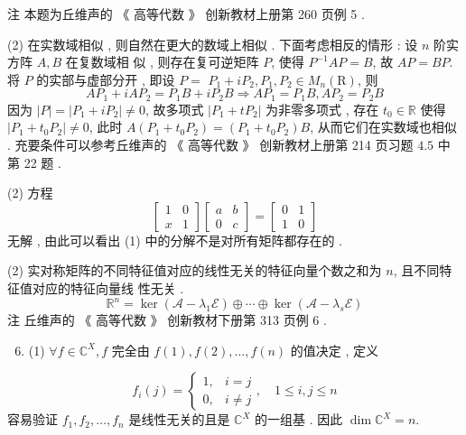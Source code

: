 \documentclass[10pt]{article}
\begin{document}
 注   本题为丘维声的 《 高等代数 》 创新教材上册第  260  页例  5 .

(2)  在实数域相似 ,  则自然在更大的数域上相似 . 下面考虑相反的情形 :  设  $n$  阶实方阵  $A, B$  在复数域相   似 ,  则存在复可逆矩阵  $P$,  使得  $P^{-1} A P=B$,  故  $A P=B P$.  将  $P$  的实部与虚部分开 ,  即设  $P=$ $P_{1}+i P_{2}, P_{1}, P_{2} \in M_{n}(\mathrm{R})$,  则 
$$
A P_{1}+i A P_{2}=P_{1} B+i P_{2} B \Longrightarrow A P_{1}=P_{1} B, A P_{2}=P_{2} B
$$
 因为  $|P|=\left|P_{1}+i P_{2}\right| \neq 0$,  故多项式  $\left|P_{1}+t P_{2}\right|$  为非零多项式 ,  存在  $t_{0} \in \mathbb{R}$  使得  $\left|P_{1}+t_{0} P_{2}\right| \neq 0$,  此时  $A\left(P_{1}+t_{0} P_{2}\right)=\left(P_{1}+t_{0} P_{2}\right) B$, 从而它们在实数域也相似 .  充要条件可以参考丘维声的 《 高等代数 》 创新教材上册第  214  页习题  $4.5$  中第  22  题 .

(2)  方程 
$$
\left[\begin{array}{ll}
1 & 0 \\
x & 1
\end{array}\right]\left[\begin{array}{ll}
a & b \\
0 & c
\end{array}\right]=\left[\begin{array}{ll}
0 & 1 \\
1 & 0
\end{array}\right]
$$
 无解 ,  由此可以看出  (1)  中的分解不是对所有矩阵都存在的 .

(2)  实对称矩阵的不同特征值对应的线性无关的特征向量个数之和为  $n$,  且不同特征值对应的特征向量线   性无关 .
$$
\mathbb{R}^{n}=\operatorname{ker}\left(\mathscr{A}-\lambda_{1} \mathscr{E}\right) \oplus \cdots \oplus \operatorname{ker}\left(\mathscr{A}-\lambda_{s} \mathscr{E}\right)
$$
 注   丘维声的 《 高等代数 》 创新教材下册第  313  页例  6 .

\begin{enumerate}
  \setcounter{enumi}{5}
  \item (1) $\forall f \in \mathbb{C}^{X}, f$  完全由  $f(1), f(2), \ldots, f(n)$  的值决定 ,  定义 
\end{enumerate}
$$
f_{i}(j)=\left\{\begin{array}{ll}
1, & i=j \\
0, & i \neq j
\end{array}, \quad 1 \leq i, j \leq n\right.
$$
 容易验证  $f_{1}, f_{2}, \ldots, f_{n}$  是线性无关的且是  $\mathbb{C}^{X}$  的一组基 .  因此  $\operatorname{dim} \mathbb{C}^{X}=n$.
\end{document}
